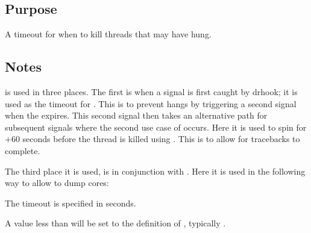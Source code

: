 \documentclass[letterpaper,10pt,english]{sphinxmanual}
\begin{document}
\subsection{Purpose}
\label{\detokenize{flag/flag:id148}}
\sphinxAtStartPar
A timeout for when to kill threads that may have hung.


\subsection{Notes}
\label{\detokenize{flag/flag:id149}}
\sphinxAtStartPar
{} is used in three places. The first is when a signal is first caught by drhook; it is used as the timeout for . This is to prevent hangs by triggering a second signal when the  expires. This second signal then takes an alternative path for subsequent signals where the second use case of  occurs. Here it is used to spin for  \(+ 60\) seconds before the thread is killed using . This is to allow for tracebacks to complete.

\sphinxAtStartPar
The third place it is used, is in conjunction with {\hyperref[\detokenize{flag/flag:atp-max-analysis-time}]{}}. Here it is used in the following way to allow  to dump cores:

\begin{sphinxVerbatim}[commandchars=\\\{\}]
\end{sphinxVerbatim}

\sphinxAtStartPar
The timeout is specified in seconds.

\sphinxAtStartPar
A value less than  will be set to the definition of , typically .
\end{document}
